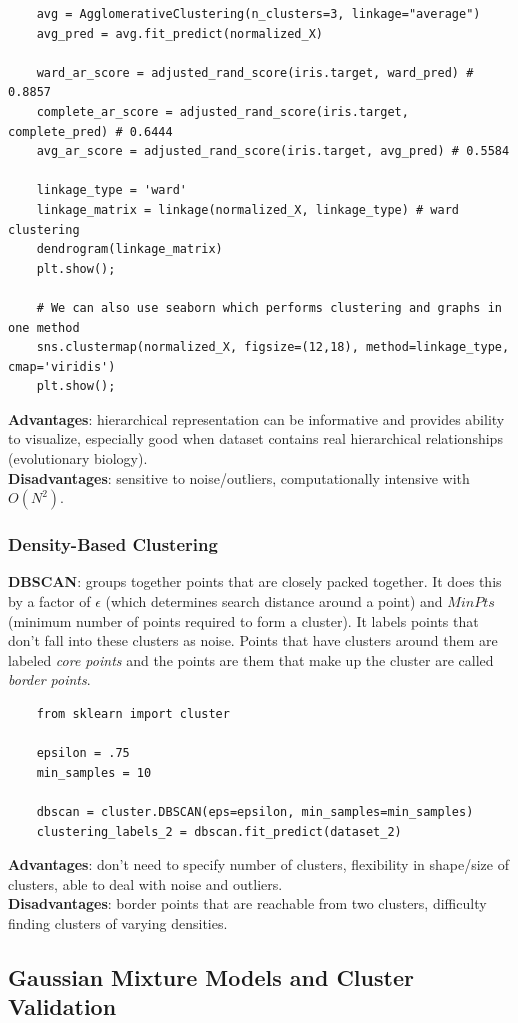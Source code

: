 \documentclass[11pt, a4paper]{article}
\begin{document}
\begin{spacing}{1.1}
\begin{lstlisting}
	avg = AgglomerativeClustering(n_clusters=3, linkage="average")
	avg_pred = avg.fit_predict(normalized_X)
	
	ward_ar_score = adjusted_rand_score(iris.target, ward_pred) # 0.8857
	complete_ar_score = adjusted_rand_score(iris.target, complete_pred) # 0.6444
	avg_ar_score = adjusted_rand_score(iris.target, avg_pred) # 0.5584
	
	linkage_type = 'ward'
	linkage_matrix = linkage(normalized_X, linkage_type) # ward clustering
	dendrogram(linkage_matrix)
	plt.show();
	
	# We can also use seaborn which performs clustering and graphs in one method
	sns.clustermap(normalized_X, figsize=(12,18), method=linkage_type, cmap='viridis')
	plt.show();
	\end{lstlisting}\vspace*{2mm}
	\textbf{Advantages}: hierarchical representation can be informative and provides ability to visualize, especially good when dataset contains real hierarchical relationships (evolutionary biology). \vspace*{2mm}\\
	\textbf{Disadvantages}: sensitive to noise/outliers, computationally intensive with $O(N^2)$.\vspace*{2mm}
	\subsubsection{Density-Based Clustering}
	\textbf{DBSCAN}: groups together points that are closely packed together. It does this by a factor of $\epsilon$ (which determines search distance around a point) and $MinPts$ (minimum number of points required to form a cluster). It labels points that don't fall into these clusters as noise. Points that have clusters around them are labeled \textit{core points} and the points are them that make up the cluster are called \textit{border points}. 
	\begin{lstlisting}
	from sklearn import cluster
	
	epsilon = .75
	min_samples = 10
	
	dbscan = cluster.DBSCAN(eps=epsilon, min_samples=min_samples)
	clustering_labels_2 = dbscan.fit_predict(dataset_2)
	\end{lstlisting} \vspace*{2mm}
	\textbf{Advantages}: don't need to specify number of clusters, flexibility in shape/size of clusters, able to deal with noise and outliers. \vspace*{2mm}\\
	\textbf{Disadvantages}: border points that are reachable from two clusters, difficulty finding clusters of varying densities. \newpage

	\subsection{Gaussian Mixture Models and Cluster Validation}
	
	
	
	
	
	
	
	
	
\end{spacing}
\end{document}
